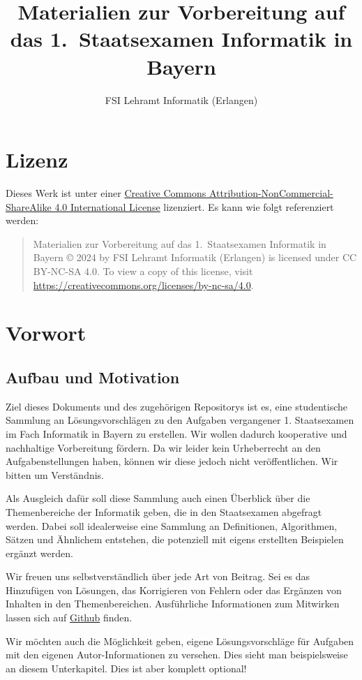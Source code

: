 \documentclass{book}
\title{Materialien zur Vorbereitung auf das 1.~Staatsexamen Informatik in Bayern}
\author{FSI Lehramt Informatik (Erlangen)}
\begin{document}
\maketitle
\chapter*{Lizenz}
Dieses Werk ist unter einer
\href{https://creativecommons.org/licenses/by-nc-sa/4.0/}{Creative Commons
Attribution-NonCommercial-ShareAlike 4.0 International License} lizenziert. Es
kann wie folgt referenziert werden:
\begin{quote}
  Materialien zur Vorbereitung auf das 1.~Staatsexamen Informatik in Bayern
  \copyright{} 2024 by FSI Lehramt Informatik (Erlangen) is licensed under CC BY-NC-SA 4.0.
  To view a copy of this license, visit \url{https://creativecommons.org/licenses/by-nc-sa/4.0}.
\end{quote}

\tableofcontents
\chapter{Vorwort}
\section{Aufbau und Motivation}
Ziel dieses Dokuments und des zugehörigen Repositorys ist es, eine studentische
Sammlung an Lösungsvorschlägen zu den Aufgaben vergangener 1. Staatsexamen im
Fach Informatik in Bayern zu erstellen. Wir wollen dadurch kooperative und
nachhaltige Vorbereitung fördern. Da wir leider kein Urheberrecht an den
Aufgabenstellungen haben, können wir diese jedoch nicht veröffentlichen. Wir
bitten um Verständnis.

Als Ausgleich dafür soll diese Sammlung auch einen Überblick über die
Themenbereiche der Informatik geben, die in den Staatsexamen abgefragt werden.
Dabei soll idealerweise eine Sammlung an Definitionen, Algorithmen, Sätzen und
Ähnlichem entstehen, die potenziell mit eigens erstellten Beispielen ergänzt
werden.

Wir freuen uns selbstverständlich über jede Art von Beitrag. Sei es das Hinzufügen von Lösungen,
das Korrigieren von Fehlern oder das Ergänzen von Inhalten in den
Themenbereichen. Ausführliche Informationen zum Mitwirken lassen sich auf
\href{https://github.com/fsi-la-inf/stex-stuff/.github/CONTRIBUTING.md}{Github} finden.

Wir möchten auch die Möglichkeit geben, eigene Lösungsvorschläge für
Aufgaben mit den eigenen Autor-Informationen zu versehen. Dies sieht man
beispielsweise an diesem Unterkapitel. Dies ist aber komplett optional!




\printindex{}
\end{document}

